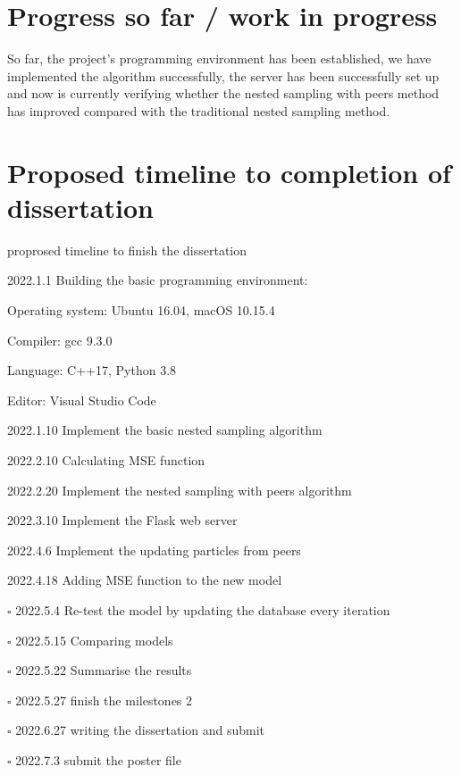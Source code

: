 \documentclass{article}
\begin{document}
\section{ Progress so far / work in progress}
So far, the project's programming environment has been established, we have implemented the algorithm successfully,
the server has been successfully set up and now 
is currently verifying whether the nested sampling with peers method has improved compared with the traditional nested sampling method.
\section{ Proposed timeline to completion of dissertation}
\begin{itemize}
    \item proprosed timeline to finish the dissertation
  
    \begin{todolist}
      \item 2022.1.1 Building the basic programming environment: 
      \begin{todolist}
        \item Operating system: Ubuntu 16.04, macOS 10.15.4
        \item Compiler: gcc 9.3.0
        \item Language: C++17, Python 3.8
        \item Editor: Visual Studio Code
      \end{todolist}
      \item 2022.1.10 Implement the basic nested sampling algorithm
      \item 2022.2.10 Calculating MSE function
      \item 2022.2.20 Implement the nested sampling with peers algorithm
      \begin{todolist}
        \item 2022.3.10 Implement the Flask web server
        \item 2022.4.6 Implement the updating particles from peers
        \item 2022.4.18 Adding MSE function to the new model
      \end{todolist}
      \item[$\square$] 2022.5.4 Re-test the model by updating the database every iteration
      \item[$\square$] 2022.5.15 Comparing models
      \item[$\square$] 2022.5.22 Summarise the results
      \item[$\square$] 2022.5.27 finish the milestones 2
      \item[$\square$] 2022.6.27 writing the dissertation and submit
      \item[$\square$] 2022.7.3 submit the poster file 
    \end{todolist}
  \end{itemize}
\end{document}
